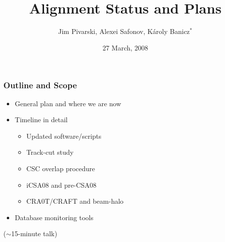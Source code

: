\documentclass[compress]{beamer}
\title{Alignment Status and Plans}
\author{Jim Pivarski, Alexei Safonov, K\'aroly Banicz$^*$}
\institute{Texas A\&M University, $^*$FermiLab}
\date{27 March, 2008}
\begin{document}
\frame{\titlepage}



\begin{frame}
\frametitle{Outline and Scope}
\begin{itemize}\setlength{\itemsep}{0.5 cm}
\item General plan and where we are now
\item Timeline in detail
\begin{itemize}\setlength{\itemsep}{0.25 cm}
\item Updated software/scripts
\item Track-cut study
\item CSC overlap procedure
\item iCSA08 and pre-CSA08
\item CRA0T/CRAFT and beam-halo
\end{itemize}
\item Database monitoring tools
\end{itemize}

\vfill \small
($\sim$15-minute talk)
\end{frame}
\end{document}

